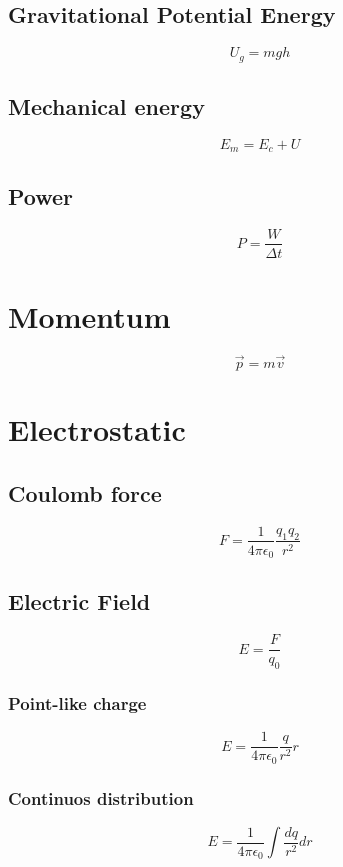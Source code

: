 \documentclass[Master.tex]{subfiles}
\begin{document}
\begin{multicols}{2}
		  \subsection{Gravitational Potential Energy}
				   \[
						    U_{g} = mgh
				   \]

		  \subsection{Mechanical energy}
				   \[
						    E_{m} = E_{c} + U
				   \]
		  \subsection{Power}
				   \[
						    P = \frac{W}{\Delta t}
				   \]

		 \section{Momentum}
		  \[
				   \vec{p} = m \vec{v}
		  \]

		 \section{Electrostatic}

		  \subsection{Coulomb force}
				   \[
						    F = \frac{1}{4 \pi  \epsilon_{0} }\frac{q_{1}q_2 }{r^2}
				   \]

		  \subsection{Electric Field}
				   \[
						    E = \frac{F}{q_{0} }
				   \]

				   \subsubsection{Point-like charge}

						    \[
								     E = \frac{1}{4 \pi \epsilon_{0}  } \frac{q}{r^{2} } r
						    \]

				   \subsubsection{Continuos distribution}
						    \[
								     E = \frac{1}{4 \pi  \epsilon_{0} } \int \frac{dq}{r^2} dr
						    \]


\end{multicols}
\end{document}
